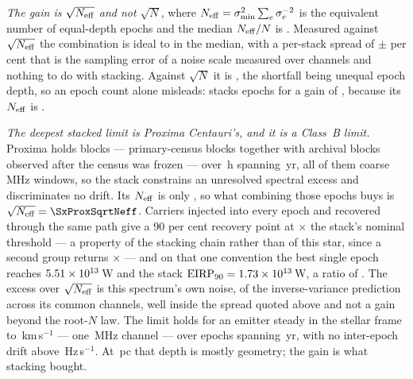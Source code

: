 \emph{The gain is $\sqrt{N_{\rm eff}}$ and not $\sqrt{N}$}, where
$N_{\rm eff}=\sigma_{\min}^{2}\sum_e\sigma_e^{-2}$ is the equivalent number of
equal-depth epochs and the median $N_{\rm eff}/N$ is \StkNeffFrac. Measured
against $\sqrt{N_{\rm eff}}$ the combination is ideal to \StkGainVsNeff{} in
the median, with a per-stack spread of $\pm$\StkMadZScatterPct{} per cent that
is the sampling error of a noise scale measured over \StkNChanMed{} channels
and nothing to do with stacking. Against $\sqrt{N}$ it is \StkGainVsN, the
shortfall being unequal epoch depth, so an epoch count alone misleads:
\StkWorstStar{} stacks \StkWorstN{} epochs for a gain of \StkWorstGain,
because its $N_{\rm eff}$ is \StkWorstNeff.

\emph{The deepest stacked limit is Proxima Centauri's, and it is a Class~B
limit.} Proxima holds \StkProxN{} blocks --- \SxProxEbCensus{} primary-census blocks
together with \SxProxEbExt{} archival blocks observed after the census was
frozen --- over
\StkProxHours\,h spanning \StkProxSpanYr\,yr, all of them coarse
\ChanBModeMHz\,MHz windows, so the stack constrains an unresolved spectral
excess and discriminates no drift. Its $N_{\rm eff}$ is only \StkProxNeff,
so what combining those epochs buys is
$\sqrt{N_{\rm eff}}=\SxProxSqrtNeff$. Carriers injected into every epoch and
recovered through the same path give a 90 per cent recovery point at
\StkCalMult$\times$ the stack's nominal threshold --- a property of the
stacking chain rather than of this star, since a second group returns
\StkCalMultTwo$\times$ --- and on that one convention the best single epoch
reaches $5.51 \times 10^{13}$\,W and the stack
$\mathrm{EIRP}_{90}=1.73\times10^{13}$\,W, a ratio of \StkProxGain. The excess
over $\sqrt{N_{\rm eff}}$ is this spectrum's own noise, \SyProxNoiseMeas{} of
the inverse-variance prediction across its \SxProxNChan{} common channels,
well inside the spread quoted above and not a gain beyond the root-$N$ law.
The limit holds for an emitter steady in the stellar frame to
\StkProxTolKms\,km\,s$^{-1}$ --- one \ChanBModeMHz\,MHz channel --- over
epochs spanning \StkProxSpanYr\,yr, with no inter-epoch drift above
\StkProxDriftHzS\,Hz\,s$^{-1}$. At \StkProxDistPc\,pc that depth is mostly
geometry; the gain is what stacking bought.

